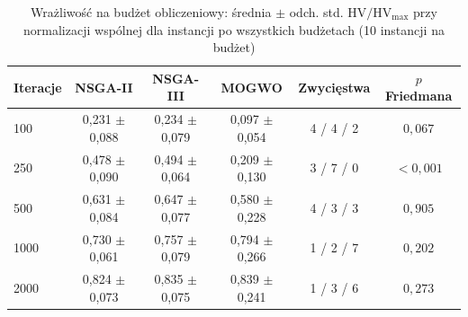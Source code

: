 \begin{table}[htbp]
    \centering
    \caption{Wrażliwość na budżet obliczeniowy: średnia $\pm$ odch. std. $\mathrm{HV}/\mathrm{HV}_{\max}$ przy normalizacji wspólnej dla instancji po wszystkich budżetach (10 instancji na budżet)}
    \label{tab:budget}
    \begin{tabular}{l c c c c c}
        \hline
        Iteracje & NSGA-II & NSGA-III & MOGWO & Zwycięstwa & $p$ Friedmana \\
        \hline
        100 & 0{,}231 $\pm$ 0{,}088 & 0{,}234 $\pm$ 0{,}079 & 0{,}097 $\pm$ 0{,}054 & 4 / 4 / 2 & $0{,}067$ \\
        250 & 0{,}478 $\pm$ 0{,}090 & 0{,}494 $\pm$ 0{,}064 & 0{,}209 $\pm$ 0{,}130 & 3 / 7 / 0 & $< 0{,}001$ \\
        500 & 0{,}631 $\pm$ 0{,}084 & 0{,}647 $\pm$ 0{,}077 & 0{,}580 $\pm$ 0{,}228 & 4 / 3 / 3 & $0{,}905$ \\
        1000 & 0{,}730 $\pm$ 0{,}061 & 0{,}757 $\pm$ 0{,}079 & 0{,}794 $\pm$ 0{,}266 & 1 / 2 / 7 & $0{,}202$ \\
        2000 & 0{,}824 $\pm$ 0{,}073 & 0{,}835 $\pm$ 0{,}075 & 0{,}839 $\pm$ 0{,}241 & 1 / 3 / 6 & $0{,}273$ \\
        \hline
    \end{tabular}
\end{table}
